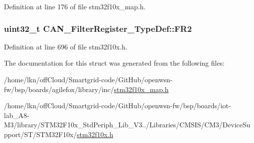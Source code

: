 Definition at line 176 of file stm32f10x\+\_\+map.\+h.

\subsubsection[{\texorpdfstring{F\+R2}{FR2}}]{ {\bf uint32\+\_\+t} C\+A\+N\+\_\+\+Filter\+Register\+\_\+\+Type\+Def\+::\+F\+R2}\hypertarget{struct_c_a_n___filter_register___type_def_a77959e28a302b05829f6a1463be7f800}{}\label{struct_c_a_n___filter_register___type_def_a77959e28a302b05829f6a1463be7f800}


Definition at line 696 of file stm32f10x.\+h.



The documentation for this struct was generated from the following files\+:\begin{DoxyCompactItemize}
\item 
/home/lkn/off\+Cloud/\+Smartgrid-\/code/\+Git\+Hub/openwsn-\/fw/bsp/boards/agilefox/library/inc/\hyperlink{agilefox_2library_2inc_2stm32f10x__map_8h}{stm32f10x\+\_\+map.\+h}\item 
/home/lkn/off\+Cloud/\+Smartgrid-\/code/\+Git\+Hub/openwsn-\/fw/bsp/boards/iot-\/lab\+\_\+\+A8-\/\+M3/library/\+S\+T\+M32\+F10x\+\_\+\+Std\+Periph\+\_\+\+Lib\+\_\+\+V3../\+Libraries/\+C\+M\+S\+I\+S/\+C\+M3/\+Device\+Support/\+S\+T/\+S\+T\+M32\+F10x/\hyperlink{iot-lab___a8-_m3_2library_2_s_t_m32_f10x___std_periph___lib___v3_85_80_2_libraries_2_c_m_s_i_s_26497265545392eb5694b064ae15018db}{stm32f10x.\+h}\end{DoxyCompactItemize}
